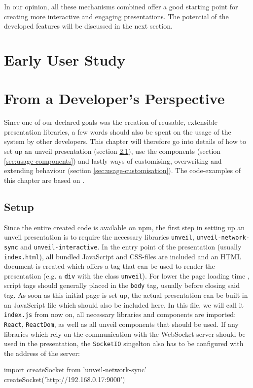 In our opinion, all these mechanisms combined offer a good starting point for creating more interactive and engaging presentations. The potential of the developed features will be discussed in the next section.

\section{Early User Study}
\label{sec:results-study}

\section{From a Developer's Perspective}
\label{sec:results-developer}

Since one of our declared goals was the creation of reusable, extensible presentation libraries, a few words should also be spent on the usage of the system by other developers. This chapter will therefore go into details of how to set up an unveil presentation (section \ref{sec:usage-setup}), use the components (section \ref{sec:usage-components}) and lastly ways of customising, overwriting and extending behaviour (section \ref{sec:usage-customisation}). The code-examples of this chapter are based on \cite{unveil-client-server}.

\subsection{Setup}
\label{sec:usage-setup}

Since the entire created code is available on npm, the first step in setting up an unveil presentation is to require the necessary libraries \texttt{unveil}, \texttt{unveil-network-sync} and \texttt{unveil-interactive}. In the entry point of the presentation (usually \texttt{index.html}), all bundled JavaScript and CSS-files are included and an HTML document is created which offers a tag that can be used to render the presentation (e.g. a \texttt{div} with the class \texttt{unveil}). For lower the page loading time \cite{yahoo-speeding-up-website}, script tags should generally placed in the \texttt{body} tag, usually before closing said tag.
As soon as this initial page is set up, the actual presentation can be built in an JavaScript file which should also be included here.
In this file, we will call it \texttt{index.js} from now on, all necessary libraries and components are imported:  \texttt{React}, \texttt{ReactDom}, as well as all unveil components that should be used. If any libraries which rely on the communication with the WebSocket server should be used in the presentation, the \texttt{SocketIO} singelton also has to be configured with the address of the server:
\begin{GenericCode}
import { createSocket } from 'unveil-network-sync'
createSocket('http://192.168.0.17:9000')
\end{GenericCode}

